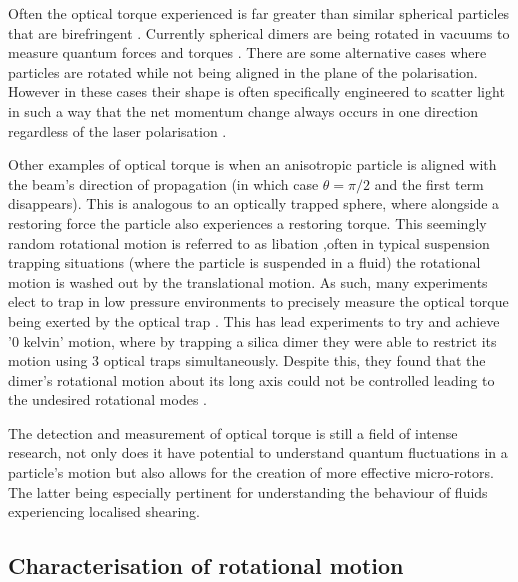 Often the optical torque experienced is far greater than similar 
spherical particles that are birefringent \cite{Bruce2020}. 
Currently spherical dimers are being rotated in vacuums to 
measure quantum forces and torques \cite{Ahn2018, Reimann2018}. 
There are some alternative cases where particles are rotated 
while not being aligned in the plane of the polarisation. However 
in these cases their shape is often specifically engineered to 
scatter light in such a way that the net momentum change always
occurs in one direction regardless of the laser polarisation 
\cite{Higurashi1994}. 

Other examples of optical torque is when an anisotropic 
particle is aligned with the beam's direction of propagation 
(in which case $\theta=\pi/2$ and the first term disappears). 
This is analogous to an optically trapped sphere, where 
alongside a restoring force the particle also experiences a 
restoring torque. This seemingly random rotational motion is 
referred to as libation \cite{Bruce2020},often in typical 
suspension trapping situations (where the particle is suspended 
in a fluid) the rotational motion is washed out by the 
translational motion. As such, many experiments elect to trap 
in low pressure environments to precisely measure the optical 
torque being exerted by the optical trap \cite{Ahn2018}. This 
has lead experiments to try and achieve '0 kelvin' motion, 
where by trapping a silica dimer they were able to restrict its 
motion using 3 optical traps simultaneously. Despite this, they 
found that the dimer's rotational motion about its long axis 
could not be controlled leading to the undesired rotational
modes \cite{Bang2020}.

The detection and measurement of optical torque is still a 
field of intense research, not only does it have potential 
to understand quantum fluctuations in a particle's motion 
but also allows for the creation of more effective
micro-rotors. The latter being especially pertinent for 
understanding the behaviour of fluids experiencing localised 
shearing.

\subsection{Characterisation of rotational motion}

